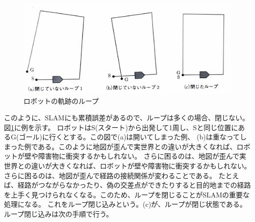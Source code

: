\begin{figure}[h]
  \begin{center}
  \includegraphics[width=.8\linewidth]{img/slam_9.pdf}
  \caption{ロボットの軌跡のループ\cite{slam:nyumon}}
  \label{slam:loop_kiseki}
  \end{center}
\end{figure}

このように、SLAMにも累積誤差があるので、ループは多くの場合、閉じない。図\ref{slam:loop_kiseki}に例を示す。
ロボットはS(スタート)から出発して1周し、Sと同じ位置にあるG(ゴール)に行くとする。この図で(a)は開いてしまった例、
(b)は重なってしまった例である。このように地図が歪んで実世界との違いが大きくなれば、ロボットが壁や障害物に衝突するかもしれない。
さらに困るのは、地図が歪んで実世界との違いが大きくなれば、ロボットが壁や障害物に衝突するかもしれない。さらに困るのは、地図が歪んで経路の接続関係が変わることである。
たとえば、経路がつながらなかったり、偽の交差点ができたりすると目的地までの経路を上手く見つけられなくなる。このため、ループを閉じることがSLAMの重要な処理になる。
これをループ閉じ込みという。(c)が、ループが閉じ状態である。ループ閉じ込みは次の手順で行う。

